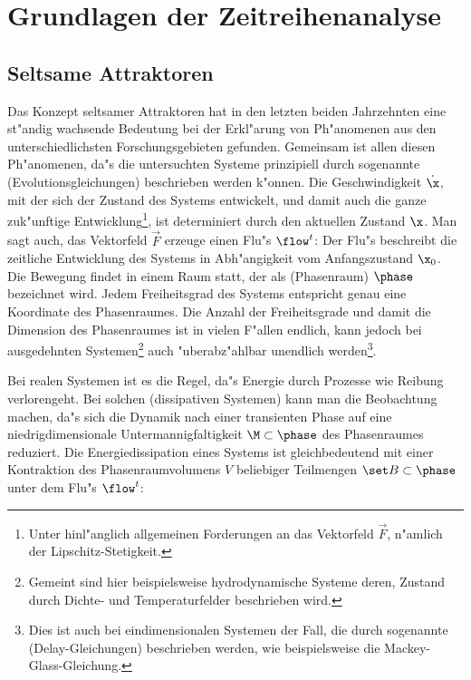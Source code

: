 \clearpage
\chapter{Grundlagen der Zeitreihenanalyse}



\section{Seltsame Attraktoren}
\label{chapdynsystems}
Das Konzept seltsamer Attraktoren hat in den letzten beiden Jahrzehnten eine
st"andig wachsende Bedeutung bei der
Erkl"arung von Ph"anomenen aus den unterschiedlichsten Forschungsgebieten gefunden. Gemeinsam
ist allen diesen Ph"anomenen, da"s die untersuchten Systeme prinzipiell durch sogenannte
\begriff(Evolutionsgleichungen)
beschrieben werden k"onnen. Die Geschwindigkeit $\dot\x$, mit der sich der Zustand des Systems entwickelt, und damit
auch die ganze zuk"unftige Entwicklung\footnote{Unter hinl"anglich allgemeinen Forderungen
an das Vektorfeld $\vec F$, n"amlich der Lipschitz-Stetigkeit.}, ist determiniert durch
den aktuellen Zustand $\x$. Man sagt auch, das Vektorfeld $\vec F$ erzeuge einen Flu"s
$\flow^t$:
Der Flu"s beschreibt die zeitliche Entwicklung des Systems in Abh"angigkeit vom
Anfangszustand $\x_0$.
Die Bewegung findet in einem Raum statt, der als \begriff(Phasenraum) $\phase$
bezeichnet wird. Jedem  Freiheitsgrad des Systems entspricht genau eine Koordinate des
Phasenraumes. Die Anzahl der Freiheitsgrade und damit die Dimension des Phasenraumes ist in
vielen F"allen endlich, kann jedoch bei ausgedehnten Systemen\footnote{Gemeint sind hier
  beispielsweise hydrodynamische Systeme deren, 
  Zustand durch Dichte- und Temperaturfelder beschrieben wird.} auch "uberabz"ahlbar
unendlich werden\footnote{Dies ist auch bei eindimensionalen Systemen der Fall, die durch
sogenannte \begriff(Delay-Gleichungen) beschrieben werden, wie beispielsweise die
Mackey-Glass-Gleichung. }.


Bei realen Systemen ist es die Regel, da"s Energie durch Prozesse wie Reibung
verlorengeht. Bei solchen \begriff(dissipativen Systemen) kann man die Beobachtung
machen, da"s sich die Dynamik nach einer transienten Phase auf eine 
niedrigdimensionale Untermannigfaltigkeit $\M\subset\phase$ des Phasenraumes
reduziert. Die Energiedissipation eines Systems ist gleichbedeutend mit einer Kontraktion
des Phasenraumvolumens $V$ beliebiger Teilmengen $\set B\subset\phase$ unter dem Flu"s $\flow^t$:

